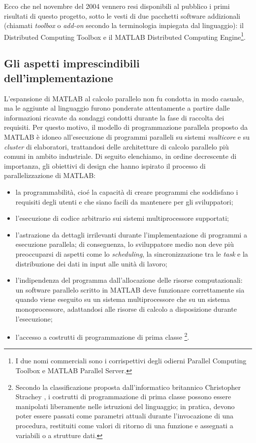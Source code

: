 Ecco che nel novembre del 2004 vennero resi disponibili al pubblico i primi risultati di questo progetto, sotto le vesti di due pacchetti software addizionali (chiamati \textit{toolbox} o \textit{add-on} secondo la terminologia impiegata dal linguaggio): il Distributed Computing 
Toolbox\textsuperscript{\texttrademark} e il MATLAB Distributed Computing Engine\textsuperscript{\texttrademark}\footnote{I due nomi commerciali sono i corrispettivi degli odierni Parallel 
Computing Toolbox\textsuperscript{\texttrademark} e MATLAB Parallel Server\textsuperscript{\texttrademark}.}.

\subsection{Gli aspetti imprescindibili dell'implementazione}
L'espansione di MATLAB al calcolo parallelo non fu condotta in modo casuale, ma le aggiunte al linguaggio furono ponderate attentamente a partire dalle informazioni ricavate da sondaggi condotti durante la fase di raccolta dei requisiti.\newline
Per questo motivo, il modello di programmazione parallela proposto da MATLAB \`e idoneo all'esecuzione di programmi paralleli su sistemi \textit{multicore} e su \textit{cluster} di elaboratori, trattandosi delle architetture di calcolo parallelo pi\`u comuni in ambito industriale.\newline
Di seguito elenchiamo, in ordine decrescente di importanza, gli obiettivi di design che hanno ispirato il processo di parallelizzazione di MATLAB:
\begin{itemize}
    \item la programmabilit\`a, cio\'e la capacit\`a di creare programmi che soddisfano i requisiti degli utenti e che siano facili da mantenere per gli sviluppatori;
    \item l'esecuzione di codice arbitrario sui sistemi multiprocessore supportati;
    \item l'astrazione da dettagli irrilevanti durante l'implementazione di programmi a esecuzione parallela; di conseguenza, lo sviluppatore medio non deve pi\`u preoccuparsi di aspetti come lo \textit{scheduling}, la sincronizzazione tra le \textit{task} e la distribuzione dei dati in input alle unit\`a di lavoro;
    \item l'indipendenza del programma dall'allocazione delle risorse computazionali: un software parallelo scritto in MATLAB deve funzionare correttamente sia quando viene eseguito su un sistema multiprocessore che su un sistema monoprocessore, adattandosi alle risorse di calcolo a disposizione durante l'esecuzione;
    \item l'accesso a costrutti di programmazione di prima classe \footnote{Secondo la classificazione proposta dall'informatico britannico Christopher Strachey \cite{SICP96}, i costrutti di programmazione di prima classe possono essere manipolati liberamente nelle istruzioni del linguaggio; in pratica, devono poter essere passati come parametri attuali durante l'invocazione di una procedura, restituiti come valori di ritorno di una funzione e assegnati a variabili o a strutture dati.}. 
\end{itemize}
